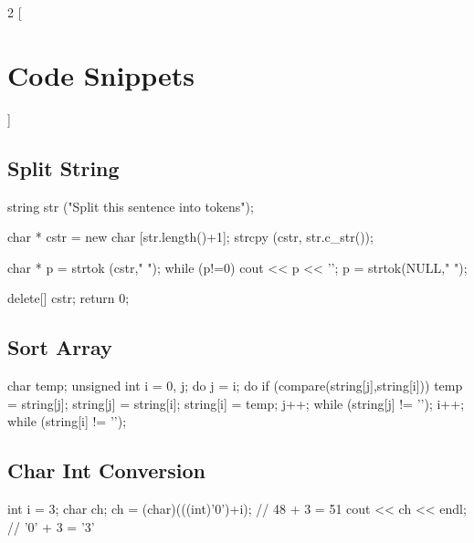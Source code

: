 \documentclass[10pt,a4paper]{extarticle}
\begin{document}
\begin{multicols}{2}
[\section*{Code Snippets}]


\subsection*{Split String}
\begin{cppcode}
  string str ("Split this sentence into tokens");

  char * cstr = new char [str.length()+1];
  strcpy (cstr, str.c_str());

  char * p = strtok (cstr," ");
  while (p!=0)
  {
    cout << p << '\n';
    p = strtok(NULL," ");
  }

  delete[] cstr;
  return 0;
\end{cppcode}

\subsection*{Sort Array}
\begin{cppcode}
  char temp;
  unsigned int i = 0, j;
  do {
    j = i;
    do {
      if (compare(string[j],string[i])){
        temp = string[j];
        string[j] = string[i];
        string[i] = temp;
      } 
      j++;
    } while (string[j] != '\0');
    i++;
  } while (string[i] != '\0');
\end{cppcode}


\subsection*{Char Int Conversion}
\begin{cppcode}
  int i = 3;
  char ch;
  ch = (char)(((int)'0')+i);  // 48 + 3 = 51
  cout << ch << endl;         // '0' + 3 = '3'
\end{cppcode}


\vfill
\columnbreak



\end{multicols}
\end{document}
